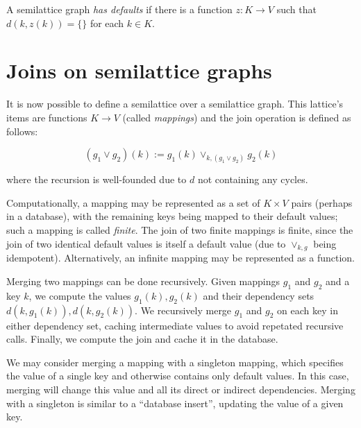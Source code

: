 \documentclass{article}
\begin{document}
        A semilattice graph \emph{has defaults} if there is a function $z : K \rightarrow V$ such that $d(k, z(k)) = \{\}$ for each $k \in K$.

    \section{Joins on semilattice graphs}

        It is now possible to define a semilattice over a semilattice graph. This lattice's items are functions $K \rightarrow V$ (called \emph{mappings}) and the join operation is defined as follows:

        $$ (g_1 \vee g_2)(k) := g_1(k) \vee_{k, (g_1 \vee g_2)} g_2(k) $$

        where the recursion is well-founded due to $d$ not containing any cycles.

        Computationally, a mapping may be represented as a set of $K \times V$ pairs (perhaps in a database), with the remaining keys being mapped to their default values; such a mapping is called \emph{finite}. The join of two finite mappings is finite, since the join of two identical default values is itself a default value (due to $\vee_{k, g}$ being idempotent). Alternatively, an infinite mapping may be represented as a function.

        Merging two mappings can be done recursively. Given mappings $g_1$ and $g_2$ and a key $k$, we compute the values $g_1(k), g_2(k)$ and their dependency sets $d(k, g_1(k)), d(k, g_2(k))$. We recursively merge $g_1$ and $g_2$ on each key in either dependency set, caching intermediate values to avoid repetated recursive calls. Finally, we compute the join and cache it in the database.

        We may consider merging a mapping with a singleton mapping, which specifies the value of a single key and otherwise contains only default values. In this case, merging will change this value and all its direct or indirect dependencies. Merging with a singleton is similar to a ``database insert'', updating the value of a given key.
\end{document}
